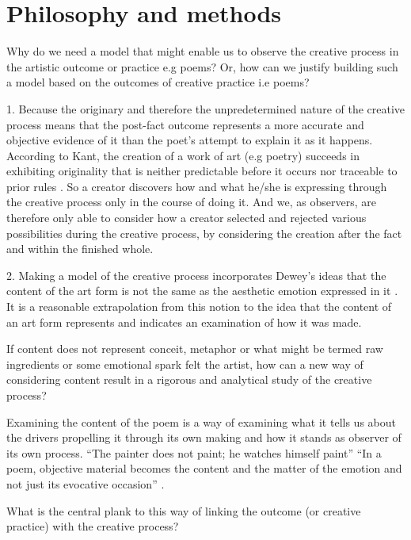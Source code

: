\section{Philosophy and methods}
\label{sec:philosophy_and_methods}

Why do we need a model that might enable us to observe the
creative process in the artistic outcome or practice e.g poems? Or,
how can we justify building such a model based on the outcomes of
creative practice i.e poems?


1. Because the originary and therefore the unpredetermined nature of
the creative process means that the post-fact outcome represents a
more accurate and objective evidence of it than the poet's attempt to
explain it as it happens.  According to Kant, the creation of a work
of art (e.g poetry) succeeds in exhibiting originality that is neither
predictable before it occurs nor traceable to prior rules
\cite{anderson1992role}.  So a creator discovers how and what he/she
is expressing through the creative process only in the course of doing
it. And we, as observers, are therefore only able to consider how a
creator selected and rejected various possibilities during the
creative process, by considering the creation after the fact and
within the finished whole.

2. Making a model of the creative process incorporates Dewey's ideas
that the content of the art form is not the same as the aesthetic
emotion expressed in it \cite[p. 35]{dewey2005art}. It is a reasonable
extrapolation from this notion to the idea that the content of an art
form represents and indicates an examination of how it was made.

If content does not represent conceit, metaphor or what
might be termed raw ingredients or some emotional spark felt the
artist, how can a new way of considering content result in a rigorous
and analytical study of the creative process?

Examining the content of the poem is a way of examining what it tells
us about the drivers propelling it through its own making and how it
stands as observer of its own process.  ``The painter does not paint;
he watches himself paint'' \cite[p. 7]{collingwood1958principles} ``In a poem, objective
material becomes the content and the matter of the emotion and not
just its evocative occasion'' \cite[p. 69]{dewey2005art}.

What is the central plank to this way of linking the outcome (or
creative practice) with the creative process?

